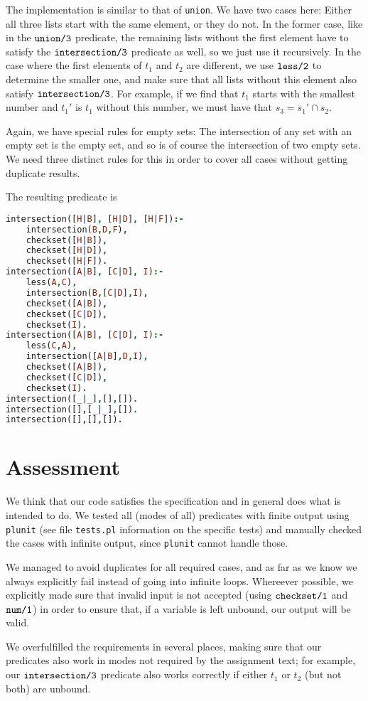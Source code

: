 \documentclass[a4paper]{article}
\newcommand{\pfuncn}[2]{\textnormal{\texttt{#1/#2}}\xspace}
\begin{document}
\begin{description}
The implementation is similar to that of \texttt{union}. We have two cases here: Either all three lists start with the same element, or they do not. In the former case, like in the $\pfuncn{union}{3}$ predicate, the remaining lists without the first element have to satisfy the $\pfuncn{intersection}{3}$ predicate as well, so we just use it recursively. In the case where the first elements of $t_1$ and $t_2$ are different, we use $\pfuncn{less}{2}$ to determine the smaller one, and make sure that all lists without this element also satisfy $\pfuncn{intersection}{3}$. For example, if we find that $t_1$ starts with the smallest number and $t_1'$ is $t_1$ without this number, we must have that $s_3 = s_1' \cap s_2$. 

Again, we have special rules for empty sets: The intersection of any set with an empty set is the empty set, and so is of course the intersection of two empty sets. We need three distinct rules for this in order to cover all cases without getting duplicate results. 

The resulting predicate is 
\begin{lstlisting}[language=prolog]
intersection([H|B], [H|D], [H|F]):-
	intersection(B,D,F),
	checkset([H|B]),
	checkset([H|D]),
	checkset([H|F]).
intersection([A|B], [C|D], I):-
	less(A,C),
	intersection(B,[C|D],I),
	checkset([A|B]),
	checkset([C|D]),
	checkset(I).
intersection([A|B], [C|D], I):-
	less(C,A),
	intersection([A|B],D,I),
	checkset([A|B]),
	checkset([C|D]),
	checkset(I).
intersection([_|_],[],[]).
intersection([],[_|_],[]).
intersection([],[],[]).
\end{lstlisting}
\end{description}

\section*{Assessment}
We think that our code satisfies the specification and in general does what is intended to do. We tested all (modes of all) predicates with finite output using \texttt{plunit} (see file \texttt{tests.pl} information on the specific tests) and manually checked the cases with infinite output, since \texttt{plunit} cannot handle those. 

We managed to avoid duplicates for all required cases, and as far as we know we always explicitly fail instead of going into infinite loops. Whereever possible, we explicitly made sure that invalid input is not accepted (using $\pfuncn{checkset}{1}$ and $\pfuncn{num}{1}$) in order to ensure that, if a variable is left unbound, our output will be valid. 

We overfulfilled the requirements in several places, making sure that our predicates also work in modes not required by the assignment text; for example, our $\pfuncn{intersection}{3}$ predicate also works correctly if either $t_1$ or $t_2$ (but not both) are unbound.
\end{document}
